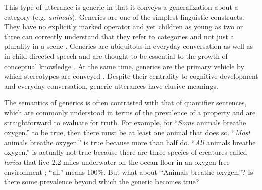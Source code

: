 \documentclass[10pt,letterpaper]{article}
\begin{document}
%
This type of utterance is generic \cite{Carlson1977, Leslie2008} in that it conveys a generalization about a category (e.g. \emph{animals}).  
Generics are one of the simplest linguistic constructs. 
They have no explicitly marked operator and yet children as young as two or three can correctly understand that they refer to categories and not just a plurality in a scene \cite{Cimpian2008}. 
Generics are ubiquitous in everyday conversation as well as in child-directed speech \cite{Gelman2008} and are thought to be essential to the growth of conceptual knowledge \cite{Gelman2004}. 
At the same time, generics are the primary vehicle by which stereotypes are conveyed \cite{GelmanEtAl2004, Cimpian2010motivation, Leslie2015}.
Despite their centrality to cognitive development and everyday conversation, generic utterances have elusive meanings. %

The semantics of generics is often contrasted with that of quantifier sentences, which are commonly understood in terms of the prevalence of a property and are straightforward to evaluate for truth. 
For example, for ``\emph{Some} animals breathe oxygen.'' to be true, then there must be at least one animal that does so. 
``\emph{Most} animals breathe oxygen.'' is true because more than half do. 
``\emph{All} animals breathe oxygen.'' is actually not true because there are three species of creatures called \emph{lorica} that live 2.2 miles underwater on the ocean floor in an oxygen-free environment \cite{Danovaro2010}; ``all'' means 100\%. 
But what about ``Animals breathe oxygen.''? 
Is there some prevalence beyond which the generic becomes true?
\end{document}

